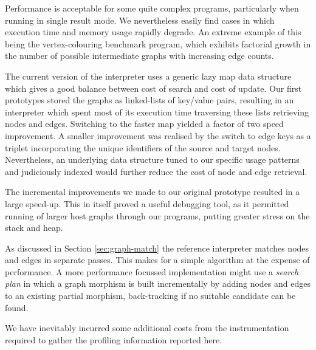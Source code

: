 Performance is acceptable for some quite complex programs, particularly when running in single result mode. We nevertheless easily find cases in which execution time and memory usage rapidly degrade. An extreme example of this being the vertex-colouring benchmark program, which exhibits factorial growth in the number of possible intermediate graphs with increasing edge counts.

The current version of the interpreter uses a generic lazy map data structure which gives a good balance between cost of search and cost of update. Our first prototypes stored the graphs as linked-lists of key/value pairs, resulting in an interpreter which spent most of its execution time traversing these lists retrieving nodes and edges. Switching to the faster map yielded a factor of two speed improvement. A smaller improvement was realised by the switch to edge keys as a triplet incorporating the unique identifiers of the source and target nodes. Nevertheless, an underlying data structure tuned to our specific usage patterns and judiciously indexed would further reduce the cost of node and edge retrieval.

The incremental improvements we made to our original prototype resulted in a large speed-up. This in itself proved a useful debugging tool, as it permitted running of larger host graphs through our programs, putting greater stress on the stack and heap.

As discussed in Section \ref{sec:graph-match} the reference interpreter matches nodes and edges in separate passes. This makes for a simple algorithm at the expense of performance. A more performance focussed implementation might use a \textit{search plan}\cite{Horvath-Varro07} in which a graph morphism is built incrementally by adding nodes and edges to an existing partial morphism, back-tracking if no suitable candidate can be found.




We have inevitably incurred some additional costs from the instrumentation required to gather the profiling information reported here.








